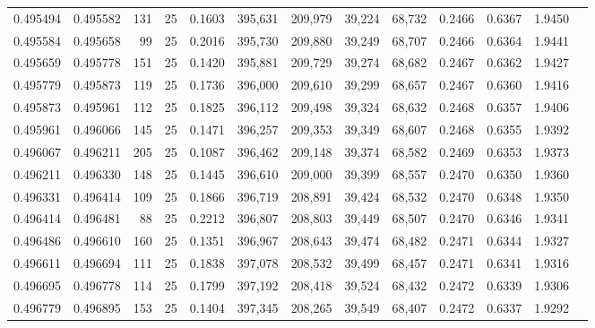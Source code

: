 \begin{tabular}{rrrrrrrrrrrrr}
0.495494 & 0.495582 &   131 &  25 &                                     0.1603 & 395,631 & 209,979 &  39,224 &  68,732 & 0.2466 & 0.6367 & 1.9450 \\
0.495584 & 0.495658 &    99 &  25 &                                     0.2016 & 395,730 & 209,880 &  39,249 &  68,707 & 0.2466 & 0.6364 & 1.9441 \\
0.495659 & 0.495778 &   151 &  25 &                                     0.1420 & 395,881 & 209,729 &  39,274 &  68,682 & 0.2467 & 0.6362 & 1.9427 \\
0.495779 & 0.495873 &   119 &  25 &                                     0.1736 & 396,000 & 209,610 &  39,299 &  68,657 & 0.2467 & 0.6360 & 1.9416 \\
0.495873 & 0.495961 &   112 &  25 &                                     0.1825 & 396,112 & 209,498 &  39,324 &  68,632 & 0.2468 & 0.6357 & 1.9406 \\
0.495961 & 0.496066 &   145 &  25 &                                     0.1471 & 396,257 & 209,353 &  39,349 &  68,607 & 0.2468 & 0.6355 & 1.9392 \\
0.496067 & 0.496211 &   205 &  25 &                                     0.1087 & 396,462 & 209,148 &  39,374 &  68,582 & 0.2469 & 0.6353 & 1.9373 \\
0.496211 & 0.496330 &   148 &  25 &                                     0.1445 & 396,610 & 209,000 &  39,399 &  68,557 & 0.2470 & 0.6350 & 1.9360 \\
0.496331 & 0.496414 &   109 &  25 &                                     0.1866 & 396,719 & 208,891 &  39,424 &  68,532 & 0.2470 & 0.6348 & 1.9350 \\
0.496414 & 0.496481 &    88 &  25 &                                     0.2212 & 396,807 & 208,803 &  39,449 &  68,507 & 0.2470 & 0.6346 & 1.9341 \\
0.496486 & 0.496610 &   160 &  25 &                                     0.1351 & 396,967 & 208,643 &  39,474 &  68,482 & 0.2471 & 0.6344 & 1.9327 \\
0.496611 & 0.496694 &   111 &  25 &                                     0.1838 & 397,078 & 208,532 &  39,499 &  68,457 & 0.2471 & 0.6341 & 1.9316 \\
0.496695 & 0.496778 &   114 &  25 &                                     0.1799 & 397,192 & 208,418 &  39,524 &  68,432 & 0.2472 & 0.6339 & 1.9306 \\
0.496779 & 0.496895 &   153 &  25 &                                     0.1404 & 397,345 & 208,265 &  39,549 &  68,407 & 0.2472 & 0.6337 & 1.9292 \\

\end{tabular}
